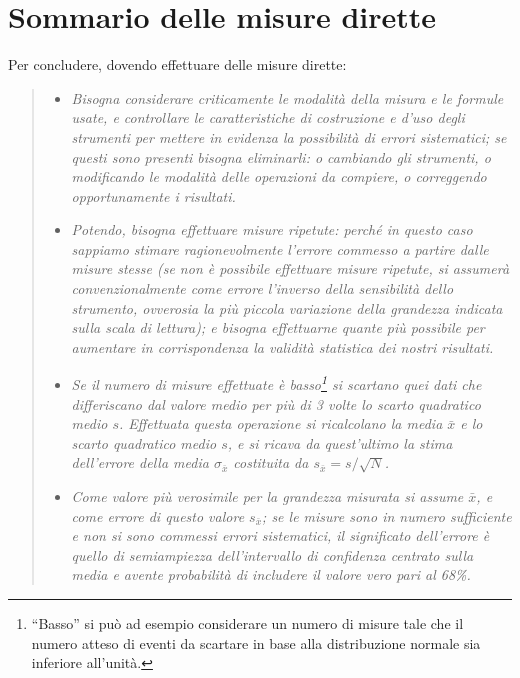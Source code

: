 \section{Sommario delle misure dirette}
Per concludere, dovendo effettuare delle misure
dirette:
\begin{quote}
  \begin{itemize}
  \item \textit{Bisogna considerare criticamente le
      modalit\`a della misura e le formule usate, e
      controllare le caratteristiche di costruzione e d'uso
      degli strumenti per mettere in evidenza la
      possibilit\`a di errori sistematici; se questi sono
      presenti bisogna eliminarli: o cambiando gli
      strumenti, o modificando le modalit\`a delle
      operazioni da compiere, o correggendo opportunamente i
      risultati.}
  \item \textit{Potendo, bisogna effettuare misure ripetute:
      perch\'e in questo caso sappiamo stimare
      ragionevolmente l'errore commesso a partire dalle
      misure stesse (se non \`e possibile effettuare misure
      ripetute, si assumer\`a convenzionalmente come errore
      l'inverso della sensibilit\`a dello strumento,
      ovverosia la pi\`u piccola variazione della grandezza
      indicata sulla scala di lettura); e bisogna
      effettuarne quante pi\`u possibile per aumentare in
      corrispondenza la validit\`a statistica dei nostri
      risultati.}
  \item \textit{Se il numero di misure effettuate \`e
      basso\thinspace\footnote{``Basso'' si pu\`o ad esempio
        considerare un numero di misure tale che il numero
        atteso di eventi da scartare in base alla
        distribuzione normale sia inferiore all'unit\`a.}
      si scartano quei dati che differiscano dal valore
      medio per pi\`u di 3 volte lo scarto quadratico medio
      $s$.  Effettuata questa operazione si ricalcolano la
      media $\bar x$ e lo scarto quadratico medio $s$, e si
      ricava da quest'ultimo la stima dell'errore della
      media $\sigma_{\bar x}$ costituita da $s_{\bar x} = s
      / \sqrt{N} $.}
  \item \textit{Come valore pi\`u verosimile per la
      grandezza misurata si assume $\bar x$, e come errore
      di questo valore $s_{\bar x}$; se le misure sono in
      numero sufficiente e non si sono commessi errori
      sistematici, il significato dell'errore \`e quello di
      semiampiezza dell'intervallo di confidenza centrato
      sulla media e avente probabilit\`a di includere il
      valore vero pari al 68\%.}
  \end{itemize}
\end{quote}

